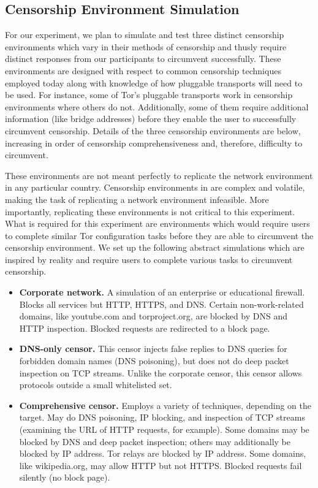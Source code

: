 \documentclass[letterpaper,twocolumn,11pt]{article}
\begin{document}
\subsection{Censorship Environment Simulation}
\indent \indent For our experiment, we plan to simulate and test three distinct censorship environments
which vary in their methods of censorship and thusly require distinct responses from our 
participants to circumvent successfully. These environments are designed with respect to 
common censorship techniques employed 
today along with knowledge of how pluggable transports will need to be used.
For instance, some of Tor's pluggable transports work in censorship environments
where others do not. Additionally, some of them require additional information (like bridge 
addresses) before they enable the user to successfully circumvent censorship. 
Details of the three censorship environments are below, increasing in 
order of censorship comprehensiveness and, therefore, difficulty to circumvent. 

These environments are not meant perfectly to replicate the network environment
in any particular country.  Censorship environments in are complex and volatile, making
the task of replicating a network environment infeasible. More importantly, replicating these
environments is not critical to this experiment. What is required for this experiment are 
environments which would require users to complete similar Tor configuration 
tasks before they are able to circumvent the censorship environment. We set up the following 
abstract simulations which are inspired by reality and require users to complete various tasks
to circumvent censorship. 

\begin{itemize} \itemsep1pt \parskip0pt 
\item{\bfseries Corporate network.}
A simulation of an enterprise or educational firewall.
Blocks all services but HTTP, HTTPS, and DNS.
Certain non-work-related domains, like youtube.com and torproject.org,
are blocked by DNS and HTTP inspection.
Blocked requests are redirected to a block page.
\item{\bfseries DNS-only censor.}
This censor injects false replies to DNS queries
for forbidden domain names (DNS poisoning),
but does not do deep packet inspection on TCP streams.
Unlike the corporate censor, this censor allows protocols
outside a small whitelisted set.
\item{\bfseries Comprehensive censor.}
Employs a variety of techniques, depending on the target.
May do DNS poisoning, IP blocking, and inspection of TCP streams
(examining the URL of HTTP requests, for example).
Some domains may be blocked by DNS and deep packet inspection;
others may additionally be blocked by IP address.
Tor relays are blocked by IP address.
Some domains, like wikipedia.org, may allow HTTP but not HTTPS.
Blocked requests fail silently (no block page).
\end{itemize}
\end{document}
